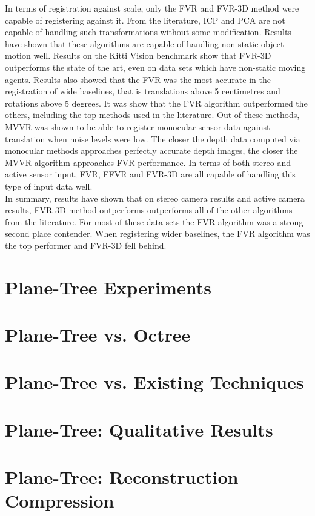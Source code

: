 In terms of registration against scale, only the FVR and FVR-3D method were capable of registering against it. From the literature, ICP and PCA are not capable of handling such transformations without some modification. Results have shown that these algorithms are capable of handling non-static object motion well. Results on the Kitti Vision benchmark show that FVR-3D outperforms the state of the art, even on data sets which have non-static moving agents. Results also showed that the FVR was the most accurate in the registration of wide baselines, that is translations above 5 centimetres and rotations above 5 degrees. It was show that the FVR algorithm outperformed the others, including the top methods used in the literature. Out of these methods, MVVR was shown to be able to register monocular sensor data against translation when noise levels were low. The closer the depth data computed via monocular methods approaches perfectly accurate depth images, the closer the MVVR algorithm approaches FVR performance. In terms of both stereo and active sensor input, FVR, FFVR and FVR-3D are all capable of handling this type of input data well. \\

In summary, results have shown that on stereo camera results and active camera results, FVR-3D method outperforms outperforms all of the other algorithms from the literature. For most of these data-sets the FVR algorithm was a strong second place contender. When registering wider baselines, the FVR algorithm was the top performer and FVR-3D fell behind.

\section{Plane-Tree Experiments}

\section{Plane-Tree vs. Octree}
\label{SEC:PTVSOT}

\section{Plane-Tree vs. Existing Techniques}
\label{SEC:PTVSSOTA}

\section{Plane-Tree: Qualitative Results}
\label{SEC:PTQUALEVAL}

\section{Plane-Tree: Reconstruction Compression}
\label{SEC:PTONRECON}




